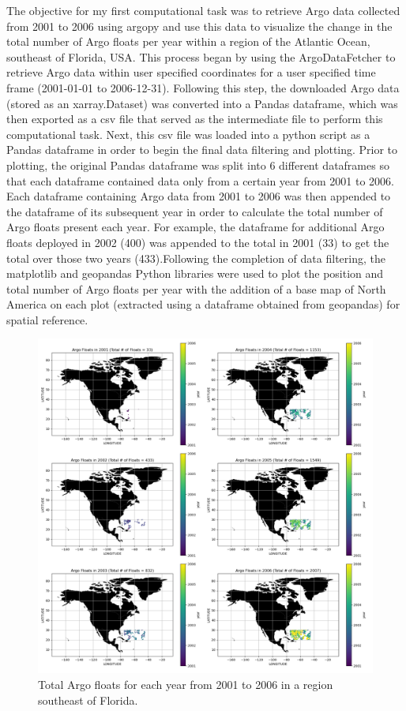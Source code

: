 \documentclass{article}
\begin{document}
The objective for my first computational task was to retrieve Argo data collected from 2001 to 2006 using argopy and use this data to visualize the change in the total number of Argo floats per year within a region of the Atlantic Ocean, southeast of Florida, USA. This process began by using the ArgoDataFetcher to retrieve Argo data within user specified coordinates for a user specified time frame (2001-01-01 to 2006-12-31). Following this step, the downloaded Argo data (stored as an xarray.Dataset) was converted into a Pandas dataframe, which was then exported as a csv file that served as the intermediate file to perform this computational task. Next, this csv file was loaded into a python script as a Pandas dataframe in order to begin the final data filtering and plotting. Prior to plotting, the original Pandas dataframe was split into 6 different dataframes so that each dataframe contained data only from a certain year from 2001 to 2006. Each dataframe containing Argo data from 2001 to 2006 was then appended to the dataframe of its subsequent year in order to calculate the total number of Argo floats present each year. For example, the dataframe for additional Argo floats deployed in 2002 (400) was appended to the total in 2001 (33) to get the total over those two years (433).Following the completion of data filtering, the matplotlib and geopandas Python libraries were used to plot the position and total number of Argo floats per year with the addition of a base map of North America on each plot (extracted using a dataframe obtained from geopandas) for spatial reference.

\begin{figure}
\includegraphics[width=\textwidth,height=\textheight,keepaspectratio]{total_argo.png}
\caption{Total Argo floats for each year from 2001 to 2006 in a region southeast of Florida.}
 
\end{figure}
\end{document}
